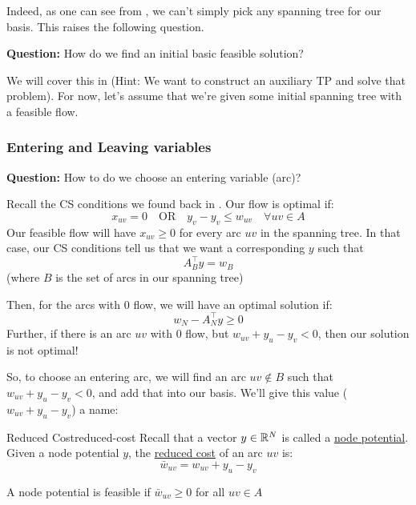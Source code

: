 Indeed, as one can see from , we can't simply pick any spanning tree for our basis. This raises the following question.

\textbf{Question: }How do we find an initial basic feasible solution?

We will cover this in  (Hint: We want to construct an auxiliary TP and solve that problem).
For now, let's assume that we're given some initial spanning tree with a feasible flow.

\subsubsection{Entering and Leaving variables}
\textbf{Question: }How to do we choose an entering variable (arc)?

Recall the CS conditions we found back in .
Our flow is optimal if:
\begin{equation*}
  x_{uv} = 0 \quad \text{OR} \quad y_v - y_v \leq w_{uv} \quad \forall uv \in A
\end{equation*}
Our feasible flow will have $x_{uv} \geq 0$ for every arc $uv$ in the spanning tree. In that case, our CS conditions tell us that we want a corresponding $y$ such that
\begin{equation*}
  A^\intercal_B y = w_B
\end{equation*}
(where $B$ is the set of arcs in our spanning tree)

Then, for the arcs with $0$ flow, we will have an optimal solution if:
\begin{equation*}
  w_N - A^\intercal_N y \geq 0
\end{equation*}
Further, if there is an arc $uv$ with $0$ flow, but $w_{uv} + y_u - y_v < 0$, then our solution is not optimal!

So, to choose an entering arc, we will find an arc $uv \not\in B$ such that $w_{uv} + y_u - y_v < 0$, and add that into our basis. We'll give this value ($w_{uv} + y_u - y_v$) a name:
\begin{definition}{Reduced Cost}{reduced-cost}
  Recall that a vector $y \in \mathbb{R}^N$ is called a \underline{node potential}. Given a node potential $y$, the \underline{reduced cost} of an arc $uv$ is:
  \begin{equation*}
    \bar{w}_{uv} = w_{uv} + y_u - y_v
  \end{equation*}
\end{definition}
\begin{note}
  A node potential is feasible if $\bar{w}_{uv} \geq 0$ for all $uv \in A$
\end{note}

